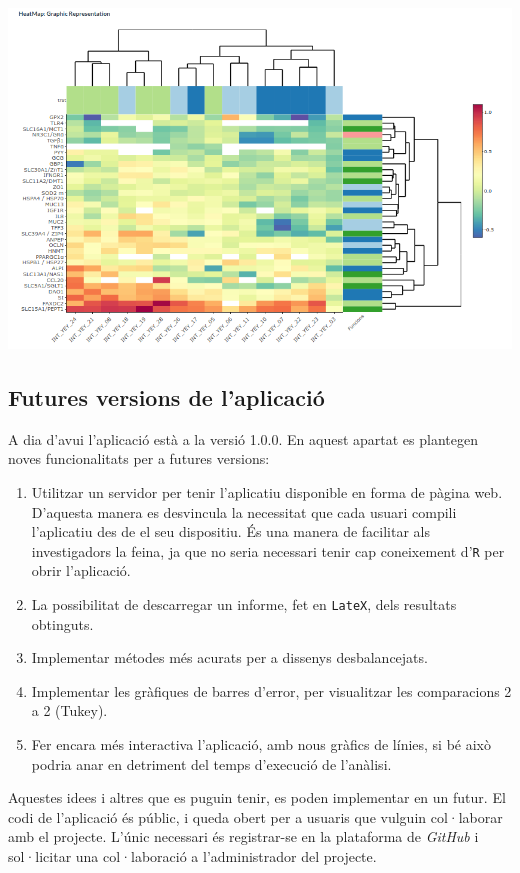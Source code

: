 \documentclass[english]{article}
\begin{document}
\begin{center}
\includegraphics[scale=0.3]{app6.png}
\end{center}

\subsection{Futures versions de l'aplicació}
A dia d'avui l'aplicació està a la versió 1.0.0. En aquest apartat es plantegen noves funcionalitats per a futures versions:
\begin{enumerate}
\item Utilitzar un servidor per tenir l'aplicatiu disponible en forma de pàgina web. D'aquesta manera es desvincula la necessitat que cada usuari compili l'aplicatiu des de el seu dispositiu. És una manera de facilitar als investigadors la feina, ja que no seria necessari tenir cap coneixement d'\texttt{R} per obrir l'aplicació.
\item La possibilitat de descarregar un informe, fet en \texttt{LateX}, dels resultats obtinguts.
\item Implementar métodes més acurats per a dissenys desbalancejats.
\item Implementar les gràfiques de barres d'error, per visualitzar les comparacions 2 a 2 (Tukey).
\item Fer encara més interactiva l'aplicació, amb nous gràfics de línies, si bé això podria anar en detriment del temps d'execució de l'anàlisi.
\end{enumerate}
Aquestes idees i altres que es puguin tenir, es poden implementar en un futur. El codi de l'aplicació és públic, i queda obert per a usuaris que vulguin col·laborar amb el projecte. L'únic necessari és registrar-se en la plataforma de \textit{GitHub} i sol·licitar una col·laboració a l'administrador del projecte.
\newpage
\end{document}
